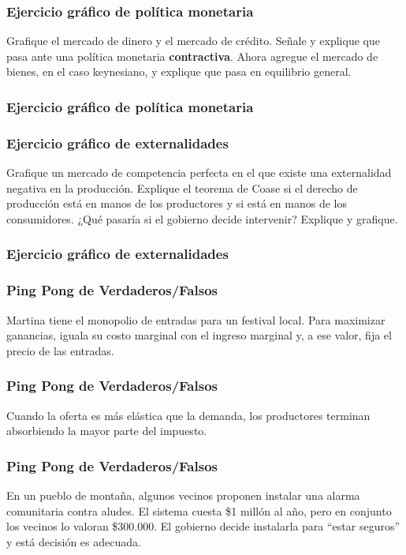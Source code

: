 \documentclass{beamer}
\begin{document}
\begin{frame}
\frametitle{Ejercicio gráfico de política monetaria}
\centering
Grafique el mercado de dinero y el mercado de crédito. Señale y explique que pasa ante una política monetaria \textbf{contractiva}. Ahora agregue el mercado de bienes, en el caso keynesiano, y explique que pasa en equilibrio general.

\end{frame}

\begin{frame}
\frametitle{Ejercicio gráfico de política monetaria}
\centering

\end{frame}

\begin{frame}
\frametitle{Ejercicio gráfico de externalidades}
\centering
Grafique un mercado de competencia perfecta en el que existe una externalidad negativa en la producción. Explique el teorema de Coase si el derecho de producción está en manos de los productores y si está en manos de los consumidores. ¿Qué pasaría si el gobierno decide intervenir? Explique y grafique. 
\end{frame}

\begin{frame}
\frametitle{Ejercicio gráfico de externalidades}
\centering

\end{frame}

\begin{frame}
\frametitle{Ping Pong de Verdaderos/Falsos}
\centering
Martina tiene el monopolio de entradas para un festival local. Para maximizar ganancias, iguala su costo marginal con el ingreso marginal y, a ese valor, fija el precio de las entradas.
\end{frame}


\begin{frame}
\frametitle{Ping Pong de Verdaderos/Falsos}
\centering
Cuando la oferta es más elástica que la demanda, los productores terminan absorbiendo la mayor parte del impuesto.
\end{frame}


\begin{frame}
\frametitle{Ping Pong de Verdaderos/Falsos}
\centering
En un pueblo de montaña, algunos vecinos proponen instalar una alarma comunitaria contra aludes. El sistema cuesta \$1 millón al año, pero en conjunto los vecinos lo valoran \$300.000. El gobierno decide instalarla para “estar seguros” y está decisión es adecuada. 
\end{frame}
\end{document}
